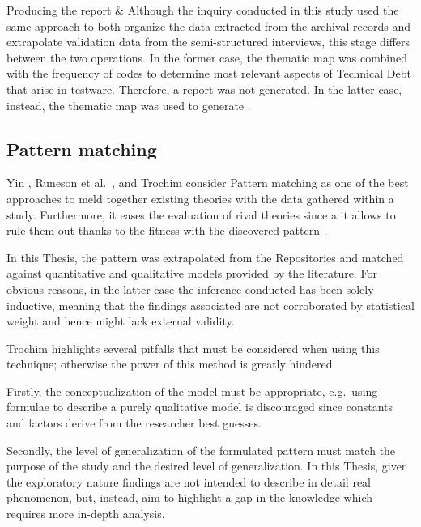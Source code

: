 \begin{table}[!htbp]
\begin{tabu}
    Producing the report &
    Although the inquiry conducted in this study used the same approach to both organize the data extracted from the archival records and extrapolate validation data from the semi-structured interviews, this stage differs between the two operations. In the former case, the thematic map was combined with the frequency of codes to determine most relevant aspects of Technical Debt that arise in testware. Therefore, a report was not generated. In the latter case, instead, the thematic map was used to generate .\\
    \hline

\end{tabu}
\caption{Description of steps taken while performing thematic analysis}
\label{tab:thematic_analysis_steps}
\end{table}


\subsection{Pattern matching}
Yin \cite{case_study_guide}, Runeson et al.\ \cite{case_study_software_engineering}, and Trochim \cite{pattern_matching} consider Pattern matching as one of the best approaches to meld together existing theories with the data gathered within a study. Furthermore, it eases the evaluation of rival theories since a it allows to rule them out thanks to the fitness with the discovered pattern \cite{pattern_matching}.

In this Thesis, the pattern was extrapolated from the Repositories and matched against quantitative and qualitative models provided by the literature. For obvious reasons, in the latter case the inference conducted has been solely inductive, meaning that the findings associated are not corroborated by statistical weight and hence might lack external validity.


Trochim \cite{pattern_matching} highlights several pitfalls that must be considered when using this technique; otherwise the power of this method is greatly hindered.

Firstly, the conceptualization of the model must be appropriate, e.g.\ using formulae to describe a purely qualitative model is discouraged since constants and factors derive from the researcher best guesses.

Secondly, the level of generalization of the formulated pattern must match the purpose of the study and the desired level of generalization. In this Thesis, given the exploratory nature findings are not intended to describe in detail real phenomenon, but, instead, aim to highlight a gap in the knowledge which requires more in-depth analysis.


